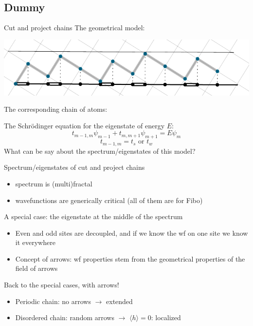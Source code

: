 \documentclass[xcolor=x11names,compress,professionalfonts]{beamer}
\renewcommand{\(}{\begin{columns}}
\renewcommand{\)}{\end{columns}}
\newcommand{\<}[1]{\begin{column}{#1}}
\renewcommand{\>}{\end{column}}
\begin{document}
\subsection{Dummy}

\begin{frame}{Cut and project chains}
		The geometrical model:
		
		{\centering
		\includegraphics[scale=0.8]{img/cut_and_project_Fibonacci.pdf}
		
		}
		
		The corresponding chain of atoms:
		
		{\centering
		
		
		}
The Schrödinger equation for the eigenstate of energy $E$:
\[
	 t_{m-1,m} \psi_{m-1} + t_{m,m+1}\psi_{m+1} = E \psi_{m}
\]
\[
	t_{m-1,m} = t_s \text{~or~} t_w
\]
What can be say about the spectrum/eigenstates of this model?
\end{frame}

\begin{frame}{Spectrum/eigenstates of cut and project chains}
\begin{itemize}
	\item spectrum is (multi)fractal
	\item wavefunctions are generically critical (all of them are for Fibo)
\end{itemize}
\end{frame}

\begin{frame}{A special case: the eigenstate at the middle of the spectrum}
\begin{itemize}
	\item Even and odd sites are decoupled, and if we know the wf on one site we know it everywhere
	\item Concept of arrows: wf properties stem from the geometrical properties of the field of arrows
\end{itemize}
\end{frame}

\begin{frame}{Back to the special cases, with arrows!}
\begin{itemize}
	\item Periodic chain: no arrows $\rightarrow$ extended
	\item Disordered chain: random arrows $\rightarrow$ $\langle h \rangle = 0$: localized
\end{itemize}
\end{frame}
\end{document}
